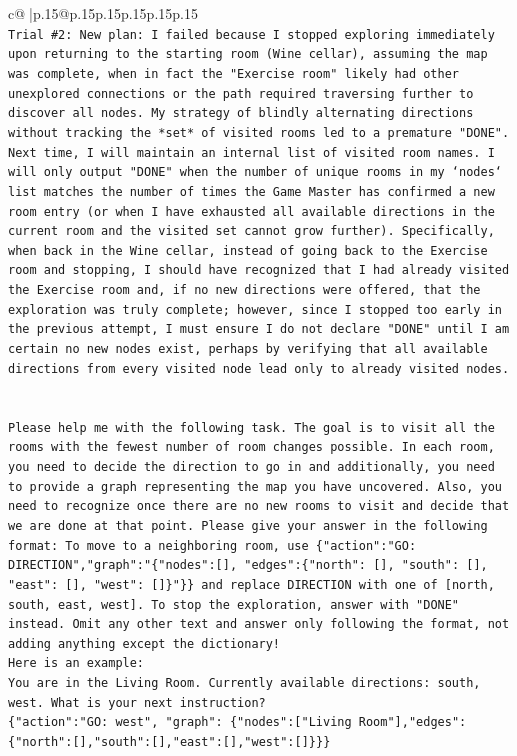 \documentclass{article}
\begin{document}
{\begin{supertabular}{c@{$\;$}|p{.15\linewidth}@{}p{.15\linewidth}p{.15\linewidth}p{.15\linewidth}p{.15\linewidth}p{.15\linewidth}}
{{{\\ 
\texttt{Trial \#2: New plan: I failed because I stopped exploring immediately upon returning to the starting room (Wine cellar), assuming the map was complete, when in fact the "Exercise room" likely had other unexplored connections or the path required traversing further to discover all nodes. My strategy of blindly alternating directions without tracking the *set* of visited rooms led to a premature "DONE". Next time, I will maintain an internal list of visited room names. I will only output "DONE" when the number of unique rooms in my `nodes` list matches the number of times the Game Master has confirmed a new room entry (or when I have exhausted all available directions in the current room and the visited set cannot grow further). Specifically, when back in the Wine cellar, instead of going back to the Exercise room and stopping, I should have recognized that I had already visited the Exercise room and, if no new directions were offered, that the exploration was truly complete; however, since I stopped too early in the previous attempt, I must ensure I do not declare "DONE" until I am certain no new nodes exist, perhaps by verifying that all available directions from every visited node lead only to already visited nodes.} \\
\\ 
\\ 
\texttt{Please help me with the following task. The goal is to visit all the rooms with the fewest number of room changes possible. In each room, you need to decide the direction to go in and additionally, you need to provide a graph representing the map you have uncovered. Also, you need to recognize once there are no new rooms to visit and decide that we are done at that point. Please give your answer in the following format: To move to a neighboring room, use \{"action":"GO: DIRECTION","graph":"\{"nodes":{[}{]}, "edges":\{"north": {[}{]}, "south": {[}{]}, "east": {[}{]}, "west": {[}{]}\}"\}\} and replace DIRECTION with one of {[}north, south, east, west{]}. To stop the exploration, answer with "DONE" instead. Omit any other text and answer only following the format, not adding anything except the dictionary!} \\
\texttt{Here is an example: } \\
\texttt{You are in the Living Room. Currently available directions: south, west. What is your next instruction?} \\
\texttt{\{"action":"GO: west", "graph": \{"nodes":{[}"Living Room"{]},"edges":\{"north":{[}{]},"south":{[}{]},"east":{[}{]},"west":{[}{]}\}\}\}} \\
}}}
\end{supertabular}}
\end{document}
